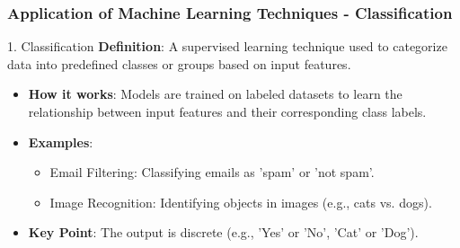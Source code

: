\documentclass[aspectratio=169]{beamer}
\begin{document}
\begin{frame}[fragile]
    \frametitle{Application of Machine Learning Techniques - Classification}
    \begin{block}{1. Classification}
        \textbf{Definition}: A supervised learning technique used to categorize data into predefined classes or groups based on input features.
    \end{block}
    \begin{itemize}
        \item \textbf{How it works}: Models are trained on labeled datasets to learn the relationship between input features and their corresponding class labels.
        \item \textbf{Examples}:
        \begin{itemize}
            \item Email Filtering: Classifying emails as 'spam' or 'not spam'.
            \item Image Recognition: Identifying objects in images (e.g., cats vs. dogs).
        \end{itemize}
        \item \textbf{Key Point}: The output is discrete (e.g., 'Yes' or 'No', 'Cat' or 'Dog').
    \end{itemize}
\end{frame}
\end{document}
